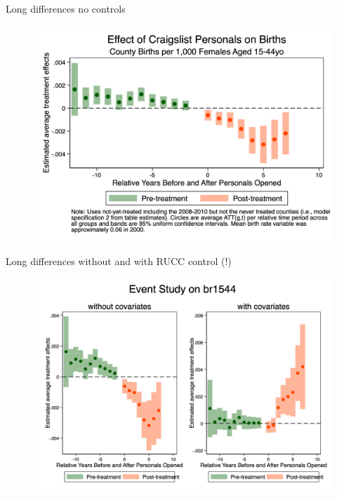 \documentclass{beamer}
\begin{document}
\begin{frame}{Long differences no controls}

\begin{figure}[ht]
    \centering
    \includegraphics[width=\linewidth, height=0.8\textheight, keepaspectratio]{./lecture_includes/es_births2.png}
\end{figure}

\end{frame}

\begin{frame}{Long differences without and with RUCC control (!)}

\begin{figure}[ht]
    \centering
    \includegraphics[width=\linewidth, height=0.8\textheight, keepaspectratio]{./lecture_includes/es_br1544_combined.png}
\end{figure}

\end{frame}
\end{document}
